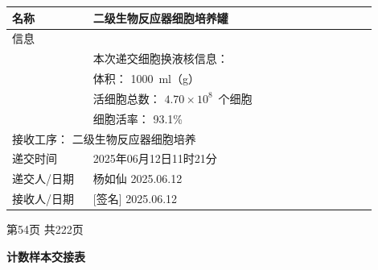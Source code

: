 \documentclass[UTF8,10pt,a4paper,fontset=fandol]{ctexart}
\newcommand{\fieldvalue}[1]{#1}
\newcommand{\handwritten}[1]{#1}
\begin{document}
\noindent
\begin{tabular}{|p{0.20\linewidth}|p{0.70\linewidth}|}
\hline
名称 &
\fieldvalue{二级生物反应器细胞培养罐}
\\ \hline
\multicolumn{2}{|l|}{信息} \\ \hline
&
本次递交细胞换液核信息：\\
&
体积：
\fieldvalue{\handwritten{1000}}\ ml（g）
\\
&
活细胞总数：
\fieldvalue{\handwritten{$4.70\times10^{8}$}}\ 个细胞
\\
&
细胞活率：
\fieldvalue{\handwritten{93.1}}\%
\\ \hline
\multicolumn{2}{|l|}{接收工序：%
\fieldvalue{二级生物反应器细胞培养}}\\ \hline
递交时间 &
\fieldvalue{\handwritten{2025年06月12日11时21分}}
\\ \hline
递交人/日期 &
\fieldvalue{\handwritten{杨如仙}}
\quad
\fieldvalue{\handwritten{2025.06.12}}
\\ \hline
接收人/日期 &
\fieldvalue{\handwritten{[签名]}}
\quad
\fieldvalue{\handwritten{2025.06.12}}
\\ \hline
\end{tabular}

\begin{center}
第54页 共222页
\end{center}

\newpage

\begin{center}
\textbf{计数样本交接表}
\end{center}
\end{document}

